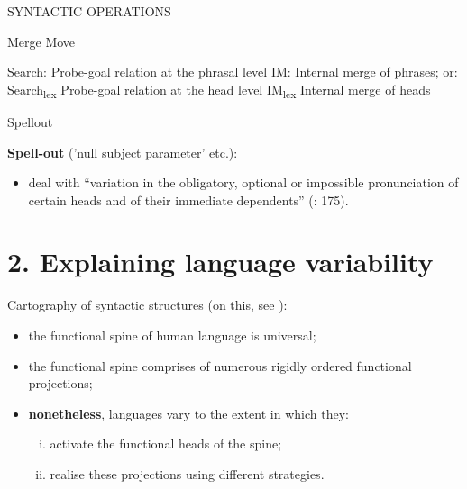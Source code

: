 \documentclass[fleqn,10pt]{wlscirep}
\begin{document}
\begin{exe}
    \ex SYNTACTIC OPERATIONS
        \begin{xlist}
            \ex Merge
            \ex Move
                \begin{xlist}
                    \ex Search:	Probe-goal relation at the phrasal level
                    \ex IM:	Internal merge of phrases; or:
                    \ex Search\textsubscript{lex}	Probe-goal relation at the head level
                    \ex IM\textsubscript{lex}	Internal merge of heads
                \end{xlist}
            \ex Spellout
        \end{xlist}
    \end{exe}

\noindent\textbf{Spell-out} ('null subject parameter' etc.): 
\begin{itemize}
    \item \vspace*{-2mm} deal with “variation in the obligatory, optional or impossible pronunciation of certain heads and of their immediate dependents” (\citealt{rizzi2017}: 175). 
\end{itemize}

\section*{2. Explaining language variability}

Cartography of syntactic structures (on this, see \citealt{cinquerizzi2010,rizzicinque2016}):
\begin{itemize}
    \item \vspace*{-2mm} the functional spine of human language is universal;
    \item \vspace*{-2mm} the functional spine comprises of numerous rigidly ordered functional projections;
    \item \vspace*{-2mm} \textbf{nonetheless}, languages vary to the extent in which they:
        \begin{enumerate}[i.]
            \item \vspace*{-2mm} activate the functional heads of the spine;
            \item \vspace*{-2mm} realise these projections using different strategies. 
        \end{enumerate}
\end{itemize}
\end{document}
